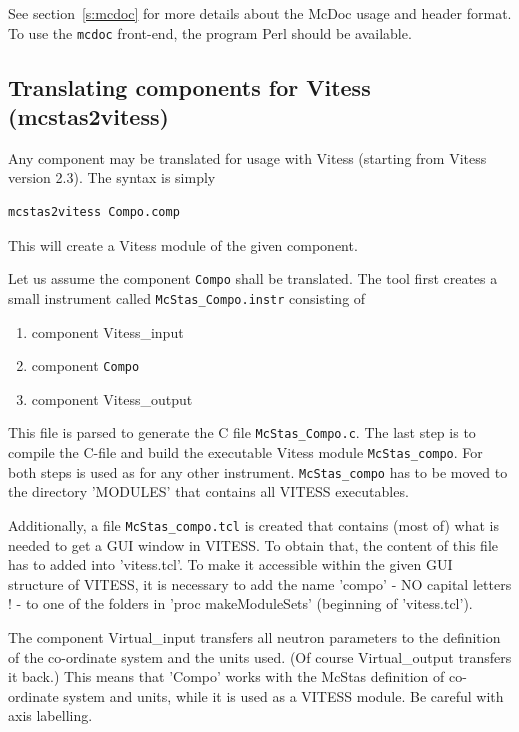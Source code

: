 See section~\ref{s:mcdoc} for more details about the McDoc usage and header
format.  To use the \verb+mcdoc+ front-end, the program Perl should be
available.

\subsection{Translating \MCS components for Vitess (mcstas2vitess)}
\label{s:mcstas2vitess}

Any \MCS component may be translated for usage with Vitess (starting from
Vitess version 2.3). The syntax is simply 
\begin{lstlisting}
mcstas2vitess Compo.comp
\end{lstlisting}
This will create a Vitess module of the given component.

Let us assume the component \verb+Compo+ shall be translated. The tool first
creates a small instrument called \verb+McStas_Compo.instr+ consisting of
\begin{enumerate}
\item component Vitess\_input
\item component \verb+Compo+
\item component Vitess\_output
\end{enumerate}

This file is parsed to generate the C file \verb+McStas_Compo.c+. The last step
is to compile the C-file and build the executable Vitess module
\verb'McStas_compo'. For both steps \MCS is used as for any other
instrument. \verb'McStas_compo' has to be moved to the directory 'MODULES' that
contains all VITESS executables.

Additionally, a file \verb'McStas_compo.tcl' is created that contains (most of)
what is needed to get a GUI window in VITESS. To obtain that, the content of
this file has to added into 'vitess.tcl'. To make it accessible within the given
GUI structure of VITESS, it is necessary to add the name 'compo' - NO capital
letters ! - to one of the folders in 'proc makeModuleSets{}' (beginning of
'vitess.tcl').

The component Virtual\_input transfers all neutron parameters to the \MCS
definition of the co-ordinate system and the units used. (Of course
Virtual\_output transfers it back.) This means that 'Compo' works with the
McStas definition of co-ordinate system and units, while it is used as a VITESS
module. Be careful with axis labelling.

